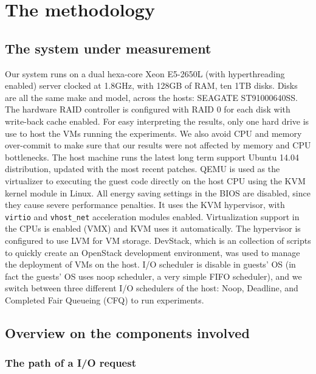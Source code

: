 \documentclass{acmsig}
\begin{document}

\section{The methodology}

\subsection{The system under measurement}

Our system runs on a dual hexa-core Xeon E5-2650L (with hyperthreading enabled) server clocked at 1.8GHz, with 128GB of RAM, ten 1TB disks. Disks are all the same make and model, across the hosts: SEAGATE ST91000640SS. The hardware RAID controller is configured with RAID 0 for each disk with write-back cache enabled. For easy interpreting the results, only one hard drive is use to host the VMs running the experiments. We also avoid  CPU and memory over-commit to make sure that our results were not affected by memory and CPU bottlenecks. The host machine runs the latest long term support Ubuntu 14.04 distribution, updated with the most recent patches. QEMU is used as the virtualizer to executing the guest code directly on the host CPU using the KVM kernel module in Linux. All energy saving settings in the BIOS are disabled, since they cause severe performance penalties. It uses the KVM hypervisor, with \texttt{virtio} and \texttt{vhost\_net} acceleration modules enabled. Virtualization support in the CPUs is enabled (VMX) and KVM uses it automatically. The hypervisor is configured to use LVM for VM storage. DevStack, which is an collection of scripts to quickly create an OpenStack development environment, was used to manage the deployment of VMs on the host. I/O scheduler is disable in guests' OS (in fact the guests' OS uses noop scheduler, a very simple FIFO scheduler), and we switch between three different I/O schedulers of the host: Noop, Deadline, and Completed Fair Queueing (CFQ) to run experiments.
\subsection{Overview on the components involved}

  \subsubsection{The path of a I/O request}
\end{document}
